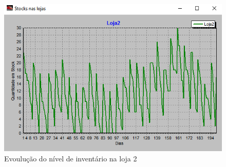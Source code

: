 \begin{figure}[<+htpb+>]
	\centering
	\includegraphics[scale=0.75]{./report-TP2/img/loja2.png}
	\caption{Evoulução do nível de inventário na loja 2}
\label{fig:figure3}
\end{figure}
